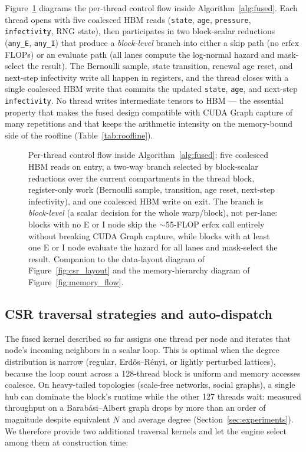 Figure~\ref{fig:fused_step} diagrams the per-thread control flow inside Algorithm~\ref{alg:fused}. Each thread opens with five coalesced HBM reads (\texttt{state}, \texttt{age}, \texttt{pressure}, \texttt{infectivity}, RNG state), then participates in two block-scalar reductions (\texttt{any\_E}, \texttt{any\_I}) that produce a \emph{block-level} branch into either a skip path (no $\mathrm{erfcx}$ FLOPs) or an evaluate path (all lanes compute the log-normal hazard and mask-select the result). The Bernoulli sample, state transition, renewal age reset, and next-step infectivity write all happen in registers, and the thread closes with a single coalesced HBM write that commits the updated \texttt{state}, \texttt{age}, and next-step \texttt{infectivity}. No thread writes intermediate tensors to HBM --- the essential property that makes the fused design compatible with CUDA Graph capture of many repetitions and that keeps the arithmetic intensity on the memory-bound side of the roofline (Table~\ref{tab:roofline}).

\begin{figure}[H]
\centering

\caption{Per-thread control flow inside Algorithm~\ref{alg:fused}: five coalesced HBM reads on entry, a two-way branch selected by block-scalar reductions over the current compartments in the thread block, register-only work (Bernoulli sample, transition, age reset, next-step infectivity), and one coalesced HBM write on exit. The branch is \emph{block-level} (a scalar decision for the whole warp/block), not per-lane: blocks with no E or I node skip the $\sim$55-FLOP $\mathrm{erfcx}$ call entirely without breaking CUDA Graph capture, while blocks with at least one E or I node evaluate the hazard for all lanes and mask-select the result. Companion to the data-layout diagram of Figure~\ref{fig:csr_layout} and the memory-hierarchy diagram of Figure~\ref{fig:memory_flow}.}
\label{fig:fused_step}
\end{figure}

\subsection{CSR traversal strategies and auto-dispatch}
\label{sec:csr_dispatch}

The fused kernel described so far assigns one thread per node and iterates that node's incoming neighbors in a scalar loop. This is optimal when the degree distribution is narrow (regular, Erd\H{o}s--R\'{e}nyi, or lightly perturbed lattices), because the loop count across a 128-thread block is uniform and memory accesses coalesce. On heavy-tailed topologies (scale-free networks, social graphs), a single hub can dominate the block's runtime while the other 127 threads wait: measured throughput on a Barab\'{a}si--Albert graph drops by more than an order of magnitude despite equivalent $N$ and average degree (Section~\ref{sec:experiments}).
We therefore provide two additional traversal kernels and let the engine select among them at construction time:

